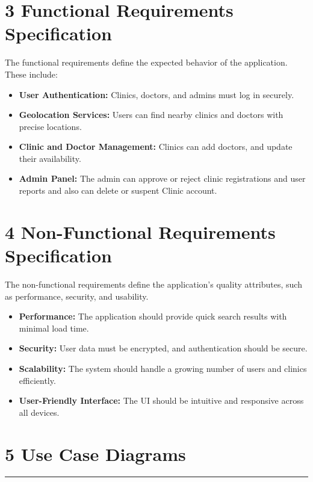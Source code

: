 \documentclass[12pt]{report}
\begin{document}
\section*{\textbf{3 Functional Requirements Specification}}

\noindent The functional requirements define the expected behavior of the application. These include:

\begin{itemize}
	\item \textbf{User Authentication:} Clinics, doctors, and admins must log in securely.
	\item \textbf{Geolocation Services:} Users can find nearby clinics and doctors with precise locations.
	\item \textbf{Clinic and Doctor Management:} Clinics can add doctors, and update their availability.
	\item \textbf{Admin Panel:} The admin can approve or reject clinic registrations and user reports and also can delete or suspent Clinic account.
\end{itemize}

\section*{\textbf{4 Non-Functional Requirements Specification}}
\noindent The non-functional requirements define the application's quality attributes, such as performance, security, and usability.

\begin{itemize}
	\item \textbf{Performance:} The application should provide quick search results with minimal load time.
	\item \textbf{Security:} User data must be encrypted, and authentication should be secure.
	\item \textbf{Scalability:} The system should handle a growing number of users and clinics efficiently.
	\item \textbf{User-Friendly Interface:} The UI should be intuitive and responsive across all devices.
\end{itemize}


\section*{\textbf{5 Use Case Diagrams}}
\rule{0.45\linewidth}{0.7pt}
\end{document}
